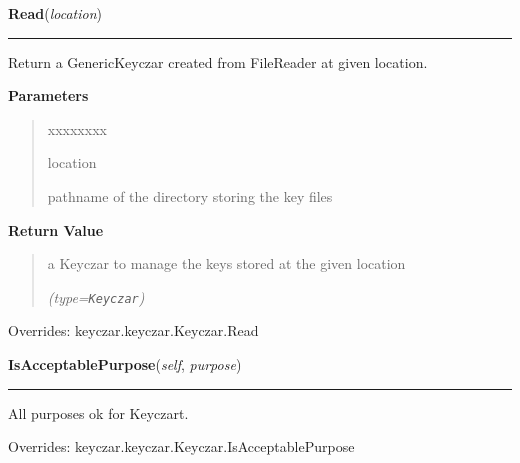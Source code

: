 \hspace{.8\funcindent}\begin{boxedminipage}{\funcwidth}

    \raggedright \textbf{Read}(\textit{location})

    \vspace{-1.5ex}

    \rule{\textwidth}{0.5\fboxrule}
\setlength{\parskip}{2ex}
    Return a GenericKeyczar created from FileReader at given location.

\setlength{\parskip}{1ex}
      \textbf{Parameters}
      \vspace{-1ex}

      \begin{quote}
        \begin{Ventry}{xxxxxxxx}

          \item[location]

          pathname of the directory storing the key files

        \end{Ventry}

      \end{quote}

      \textbf{Return Value}
    \vspace{-1ex}

      \begin{quote}
      a Keyczar to manage the keys stored at the given location

      {\it (type=\texttt{Keyczar})}

      \end{quote}

      Overrides: keyczar.keyczar.Keyczar.Read

    \end{boxedminipage}

    \vspace{0.5ex}

\hspace{.8\funcindent}\begin{boxedminipage}{\funcwidth}

    \raggedright \textbf{IsAcceptablePurpose}(\textit{self}, \textit{purpose})

    \vspace{-1.5ex}

    \rule{\textwidth}{0.5\fboxrule}
\setlength{\parskip}{2ex}
    All purposes ok for Keyczart.

\setlength{\parskip}{1ex}
      Overrides: keyczar.keyczar.Keyczar.IsAcceptablePurpose

    \end{boxedminipage}


